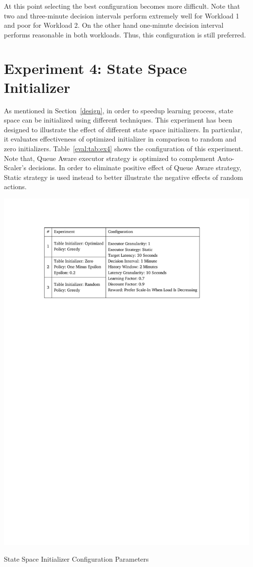 At this point selecting the best configuration becomes more difficult. Note that two and three-minute decision intervals perform extremely well for Workload 1 and poor for Workload 2. On the other hand one-minute decision interval performs reasonable in both workloads. Thus, this configuration is still preferred.

\clearpage
\section{Experiment 4: State Space Initializer}
As mentioned in Section~\ref{design}, in order to speedup learning process, state space can be initialized using different techniques. This experiment has been designed to illustrate the effect of different state space initializers. In particular, it evaluates effectiveness of optimized initializer in comparison to random and zero initializers. Table~\ref{eval:tab:ex4} shows the configuration of this experiment. Note that, Queue Aware executor strategy is optimized to complement Auto-Scaler's decisions. In order to eliminate positive effect of Queue Aware strategy, Static strategy is used instead to better illustrate the negative effects of random actions.
\begin{table}[h]
    \includegraphics[clip,trim=3.3cm 21.18cm 4.1cm 2.5cm]{tables/ex4.pdf}
    \centering
    \caption{State Space Initializer Configuration Parameters}
    \label{eval:tab:ex4}
\end{table}

